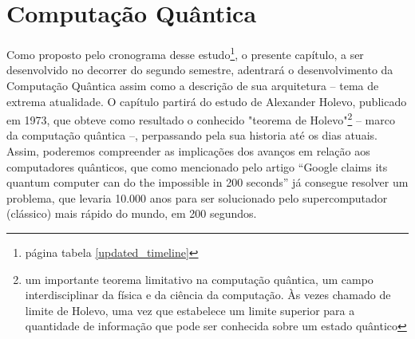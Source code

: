 \section{Computação Quântica} 
\label{quantum_comp}
Como proposto pelo cronograma desse estudo\footnote{página \pageref{updated_timeline} tabela \ref{updated_timeline}}, o presente capítulo, a ser desenvolvido no decorrer do segundo semestre, adentrará o desenvolvimento da Computação Quântica assim como a descrição de sua arquitetura – tema de extrema atualidade. O capítulo partirá do estudo de Alexander Holevo, publicado em 1973, que obteve como resultado o conhecido "teorema de Holevo"\footnote{um importante teorema limitativo na computação quântica, um campo interdisciplinar da física e da ciência da computação. Às vezes chamado de limite de Holevo, uma vez que estabelece um limite superior para a quantidade de informação que pode ser conhecida sobre um estado quântico} – marco da computação quântica –, perpassando pela sua historia até os dias atuais. Assim, poderemos compreender as implicações dos avanços em relação aos computadores quânticos, que como mencionado pelo artigo “Google claims its quantum computer can do the impossible in 200 seconds” \cite{16} já consegue resolver um problema, que levaria 10.000 anos para ser solucionado pelo supercomputador (clássico) mais rápido do mundo, em 200 segundos.
\newpage